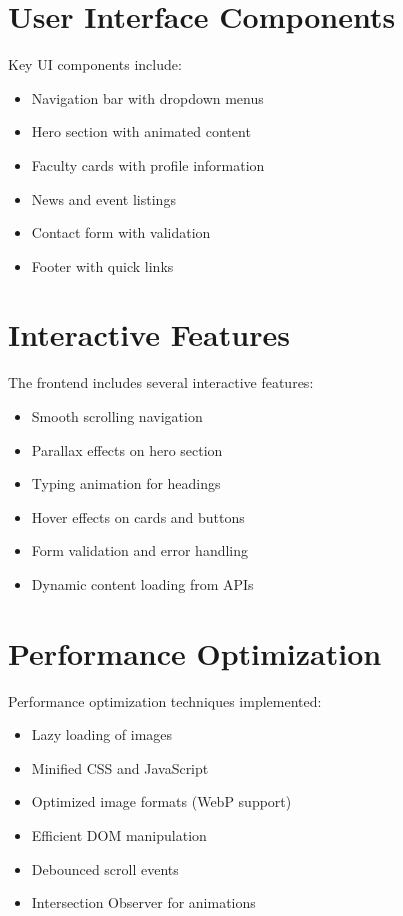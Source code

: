 \documentclass[12pt,a4paper]{report}
\begin{document}
\section{User Interface Components}
Key UI components include:
\begin{itemize}
    \item Navigation bar with dropdown menus
    \item Hero section with animated content
    \item Faculty cards with profile information
    \item News and event listings
    \item Contact form with validation
    \item Footer with quick links
\end{itemize}

\section{Interactive Features}
The frontend includes several interactive features:
\begin{itemize}
    \item Smooth scrolling navigation
    \item Parallax effects on hero section
    \item Typing animation for headings
    \item Hover effects on cards and buttons
    \item Form validation and error handling
    \item Dynamic content loading from APIs
\end{itemize}

\section{Performance Optimization}
Performance optimization techniques implemented:
\begin{itemize}
    \item Lazy loading of images
    \item Minified CSS and JavaScript
    \item Optimized image formats (WebP support)
    \item Efficient DOM manipulation
    \item Debounced scroll events
    \item Intersection Observer for animations
\end{itemize}
\end{document}
